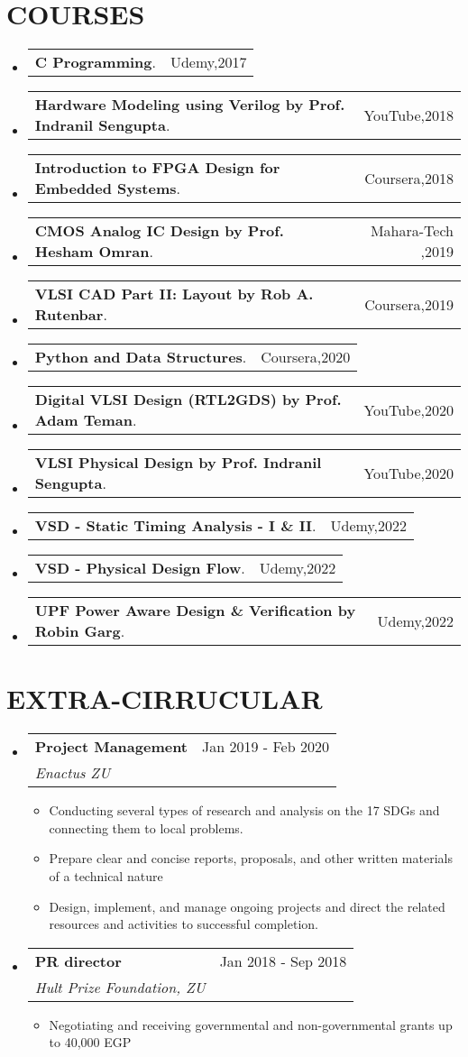 \documentclass[letterpaper,11pt]{article}
\makeatletter
\newcommand{\sectionStart}{
  \begin{itemize}[label={},leftmargin=0in]
}
\newcommand{\sectionEnd}{
  \end{itemize}
}
\newcommand{\jobHeading}[3]{
  \vspace{-1pt}
  \item
  \begin{tabular*}{1.0\textwidth}{l@{\extracolsep{\fill}}r@{}}
    \normalsize{\textbf{#1}} & #2 \\
    \textit{\small#3} \\
  \end{tabular*}\vspace{-5pt}
}
\newcommand{\coureseItem}[2]{
	\vspace{-1pt}
	\item
	\begin{tabular*}{1.0\textwidth}{l@{\extracolsep{\fill}}r@{}}
		{\textbf{#1}. } & {#2}
	\end{tabular*}\vspace{-17pt}
}
\newcommand{\listStart}{\begin{itemize}}
\newcommand{\listEnd}{\end{itemize}\vspace{-5pt}}
\newcommand{\bulletItem}[1]{
  \item
  \small{
    {#1 \vspace{-1.8pt}}
  }
}
\makeatother
\begin{document}
\section{COURSES}
  \sectionStart
	\coureseItem
	{C Programming}
	{Udemy,2017}
\coureseItem
{Hardware Modeling using Verilog by Prof. Indranil Sengupta}
{YouTube,2018}
\coureseItem
{Introduction to FPGA Design for Embedded Systems}
{Coursera,2018}
\coureseItem
{CMOS Analog IC Design by Prof. Hesham Omran}
{Mahara-Tech ,2019}
\coureseItem
{VLSI CAD Part II: Layout by Rob A. Rutenbar}
{Coursera,2019}	
\coureseItem
{Python and Data Structures}
{Coursera,2020}
\coureseItem
{Digital VLSI Design (RTL2GDS) by Prof. Adam Teman}
{YouTube,2020}
\coureseItem
{VLSI Physical Design by Prof. Indranil Sengupta}
{YouTube,2020}		
\coureseItem
{VSD - Static Timing Analysis - I \& II}
{Udemy,2022}
\coureseItem
{VSD - Physical Design Flow}
{Udemy,2022}
\coureseItem
{UPF Power Aware Design \& Verification by Robin Garg}
{Udemy,2022}
\sectionEnd
\section{EXTRA-CIRRUCULAR}
\sectionStart
  \jobHeading
    {Project Management}
    {Jan 2019 - Feb 2020}
    {Enactus ZU}
  \listStart
  \bulletItem
  	{Conducting several types of research and analysis on the 17 SDGs and connecting them to local problems.}
    \bulletItem
    {Prepare clear and concise reports, proposals, and other written materials of a technical nature}
    \bulletItem
    {Design, implement, and manage ongoing projects and direct the related resources and activities to successful completion.}
  \listEnd
  \jobHeading
    {PR director}
    {Jan 2018 - Sep 2018}
    {Hult Prize Foundation, ZU}
  \listStart
    \bulletItem
    {Negotiating and receiving governmental and non-governmental grants up to 40,000 EGP}
  \listEnd
\sectionEnd
\end{document}

